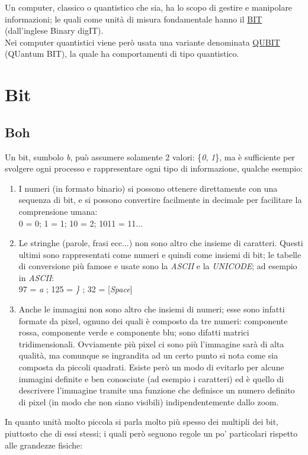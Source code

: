 Un computer, classico o quantistico che sia, ha lo scopo di gestire e manipolare informazioni; le quali come unità di misura fondamentale hanno il \underline{BIT} (dall'inglese Binary digIT).\\
Nei computer quantistici viene però usata una variante denominata \underline{QUBIT} (QUantum BIT), la quale ha comportamenti di tipo quantistico.
\section{Bit}
\subsection{Boh}
Un bit, sumbolo \textit{b}, può assumere solamente 2 valori: \{\textit{0}, \textit{1}\}, ma è sufficiente per svolgere ogni processo e rappresentare ogni tipo di informazione, qualche esempio:
\begin{enumerate}
\item I numeri (in formato binario) si possono ottenere direttamente con una sequenza di bit, e si possono convertire facilmente in decimale per facilitare la comprensione umana:\\
\textsc{0 = 0}; \textsc{1 = 1}; \textsc{10 = 2}; \textsc{1011 = 11}...
\item Le stringhe (parole, frasi ecc...) non sono altro che insieme di caratteri. Questi ultimi sono rappresentati come numeri e quindi come insiemi di bit; le tabelle di conversione più famose e usate sono la \textit{ASCII} e la \textit{UNICODE}; ad esempio in \textit{ASCII}:\\
97 = \textit{a} ; 125 = \textit{\}} ; 32 = [\textit{Space}]\\
\item Anche le immagini non sono altro che insiemi di numeri; esse sono infatti formate da pixel, ognuno dei quali è composto da tre numeri: componente rossa, componente verde e componente blu; sono difatti matrici tridimensionali. Ovviamente più pixel ci sono più l'immagine sarà di alta qualità, ma comunque se ingrandita ad un certo punto si nota come sia composta da piccoli quadrati. Esiste però un modo di evitarlo per alcune immagini definite e ben conosciute (ad esempio i caratteri) ed è quello di descrivere l'immagine tramite una funzione che definisce un numero definito di pixel (in modo che non siano visibili) indipendentemente dallo zoom.
\end{enumerate}
In quanto unità molto piccola si parla molto più spesso dei multipli dei bit, piuttosto che di essi stessi; i quali però seguono regole un po' particolari rispetto alle grandezze fisiche:\\
